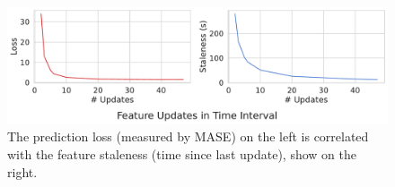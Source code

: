 \begin{figure}[t]
\begin{center}
\includegraphics[width=\linewidth]{ralf/figures/loss_staleness_2.pdf}
\centering
\end{center}
\caption{The prediction loss (measured by MASE) on the left is correlated with the feature staleness (time since last update), show on the right. }
\label{f:staleness}
\end{figure}






